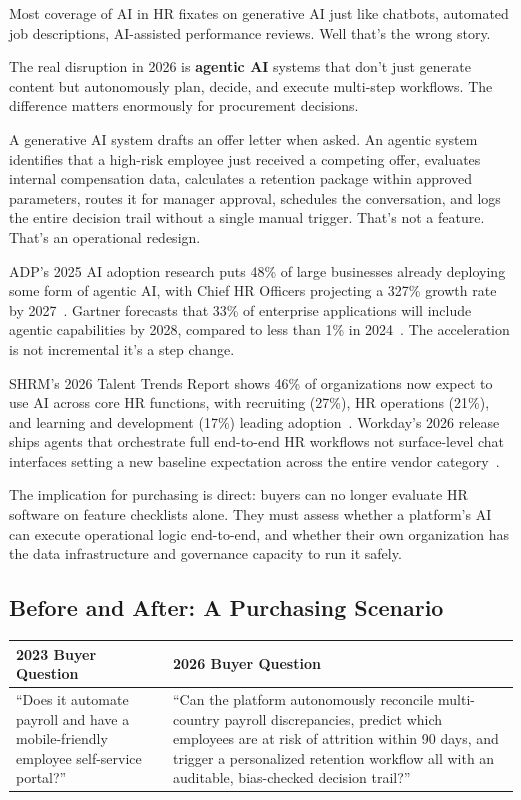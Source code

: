 \documentclass[12pt, a4paper]{article}
\begin{document}
Most coverage of AI in HR fixates on generative AI just like chatbots, automated job descriptions,
AI-assisted performance reviews. Well that's the wrong story.

The real disruption in 2026 is \textbf{agentic AI} systems that don't just generate
content but autonomously plan, decide, and execute multi-step workflows. The difference
matters enormously for procurement decisions.

A generative AI system drafts an offer letter when asked. An agentic system identifies
that a high-risk employee just received a competing offer, evaluates internal compensation
data, calculates a retention package within approved parameters, routes it for manager
approval, schedules the conversation, and logs the entire decision trail without a
single manual trigger. That's not a feature. That's an operational redesign.

ADP's 2025 AI adoption research puts 48\% of large businesses already deploying some form
of agentic AI, with Chief HR Officers projecting a 327\% growth rate by 2027~\cite{adp2025}.
Gartner forecasts that 33\% of enterprise applications will include agentic capabilities
by 2028, compared to less than 1\% in 2024~\cite{gartner2026}. The acceleration is not
incremental it's a step change.

SHRM's 2026 Talent Trends Report shows 46\% of organizations now expect to use AI across
core HR functions, with recruiting (27\%), HR operations (21\%), and learning and
development (17\%) leading adoption~\cite{shrm2026}. Workday's 2026 release ships agents
that orchestrate full end-to-end HR workflows not surface-level chat interfaces setting
a new baseline expectation across the entire vendor category~\cite{workday2026}.

The implication for purchasing is direct: buyers can no longer evaluate HR software on
feature checklists alone. They must assess whether a platform's AI can execute operational
logic end-to-end, and whether their own organization has the data infrastructure and
governance capacity to run it safely.

\subsection*{Before and After: A Purchasing Scenario}

\begin{center}
\begin{tabularx}{\linewidth}{X X}
\toprule
\textbf{2023 Buyer Question} & \textbf{2026 Buyer Question} \\
\midrule
``Does it automate payroll and have a mobile-friendly employee self-service portal?'' &
``Can the platform autonomously reconcile multi-country payroll discrepancies, predict
which employees are at risk of attrition within 90 days, and trigger a personalized
retention workflow all with an auditable, bias-checked decision trail?'' \\
\bottomrule
\end{tabularx}
\end{center}
\end{document}
